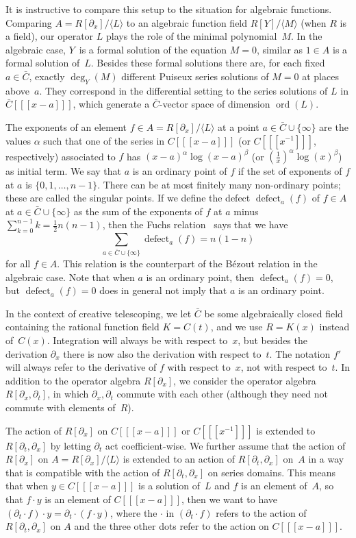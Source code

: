 \documentclass{sig-alternate}
\def\ord{\operatorname{ord}}
\def\<#1>{\langle#1\rangle}
\begin{document}
It is instructive to compare this setup to the situation for algebraic
functions. Comparing $A=R[\partial_x]/\<L>$ to an algebraic function field $R[Y]/\<M>$
(when $R$ is a field), our operator $L$ plays the role of the minimal
polynomial~$M$. In the algebraic case, $Y$~is a formal solution of the equation
$M=0$, similar as $1\in A$ is a formal solution of~$L$. Besides these formal
solutions there are, for each fixed $a\in\bar C$, exactly $\deg_Y(M)$ different
Puiseux series solutions of $M=0$ at places above~$a$. They correspond in the
differential setting to the series solutions of $L$ in $\bar C[[[x-a]]]$, which
generate a $\bar C$-vector space of dimension $\ord(L)$.

\def\defect{\operatorname{defect}}%
The exponents of an element $f\in A=R[\partial_x]/\<L>$ at a point $a\in\bar C\cup\{\infty\}$
are the values $\alpha$ such that one of the series in $C[[[x-a]]]$ (or $C[[[x^{-1}]]]$, respectively)
associated to $f$ has $(x-a)^\alpha\log(x-a)^\beta$ (or $(\frac1x)^\alpha\log(x)^\beta$) as initial
term. We say that $a$ is an ordinary point of $f$ if the set of exponents of $f$ at $a$ is $\{0,1,\dots,n-1\}$.
There can be at most finitely many non-ordinary points; these are called the singular points. If we define
the defect $\defect_a(f)$ of $f\in A$ at $a\in\bar C\cup\{\infty\}$ as the sum of the exponents of $f$ at $a$ minus
$\sum_{k=0}^{n-1}k=\frac12n(n-1)$, then the Fuchs relation~\cite{schlesinger95,ince26} says that we have
\[
 \sum_{a\in\bar C\cup\{\infty\}} \defect_a(f) = n(1-n)
\]
for all $f\in A$. This relation is the counterpart of the B\'{e}zout relation in the algebraic case.
Note that when $a$ is an ordinary point, then $\defect_a(f)=0$, but $\defect_a(f)=0$ does in
general not imply that $a$ is an ordinary point.

In the context of creative telescoping, we let $\bar C$ be some algebraically
closed field containing the rational function field $K=C(t)$, and we
use $R=K(x)$ instead of~$C(x)$. Integration will always be with respect to~$x$, but
besides the derivation $\partial_x$ there is now also the derivation with respect
to~$t$. The notation $f'$ will always refer to the derivative of $f$
with respect to~$x$, not with respect to~$t$. In addition to the operator
algebra $R[\partial_x]$, we consider the
operator algebra $R[\partial_x,\partial_t]$, in which $\partial_x,\partial_t$
commute with each other (although they need not commute with elements of~$R$).

The action of $R[\partial_x]$ on $C[[[x-a]]]$ or $C[[[x^{-1}]]]$ is extended
to $R[\partial_t,\partial_x]$ by letting $\partial_t$ act coefficient-wise.
We further assume that the action of $R[\partial_x]$ on $A=R[\partial_x]/\<L>$ is
extended to an action of $R[\partial_t,\partial_x]$ on~$A$ in a way that is
compatible with the action of $R[\partial_t,\partial_x]$ on series domains.
This means that when $y\in C[[[x-a]]]$ is a solution of~$L$ and $f$ is an
element of~$A$, so that $f\cdot y$ is an element of $C[[[x-a]]]$, then we
want to have $(\partial_t\cdot f)\cdot y=\partial_t\cdot(f\cdot y)$, where
the $\cdot$ in $(\partial_t\cdot f)$ refers to the action of $R[\partial_t,\partial_x]$
on $A$ and the three other dots refer to the action on $C[[[x-a]]]$.
\end{document}
